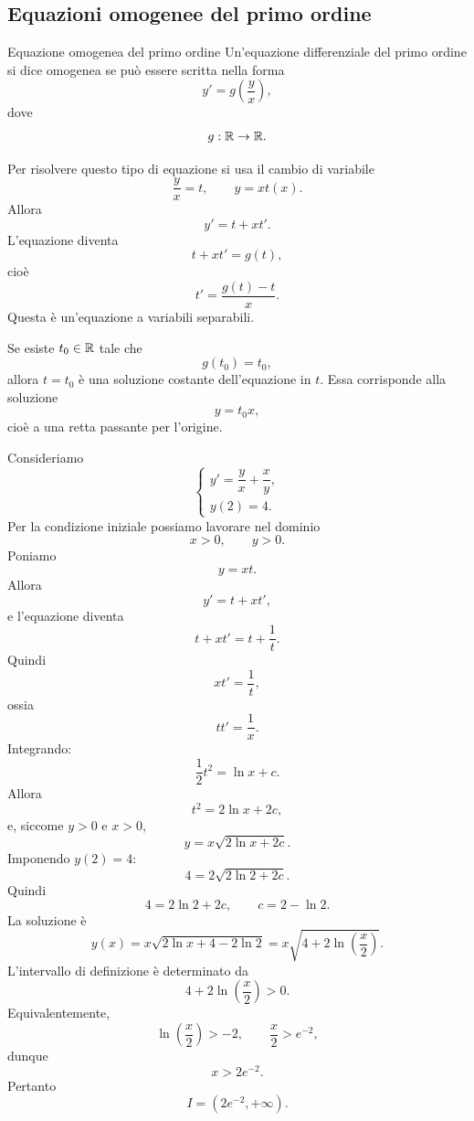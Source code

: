 \documentclass[a4paper]{article}
\begin{document}
\subsection{Equazioni omogenee del primo ordine}

\begin{radioactive}
\begin{snippetdefinition}{Equazione omogenea del primo ordine}
    Un'equazione differenziale del primo ordine si dice omogenea se può essere scritta nella forma
    \[
        y'=g\left(\frac{y}{x}\right),
    \]
    dove
    \[
        g:\mathbb{R}\to\mathbb{R}.
    \]
\end{snippetdefinition}
\end{radioactive}

\begin{radioactive}
Per risolvere questo tipo di equazione si usa il cambio di variabile
\[
    \frac{y}{x}=t,
    \qquad
    y=xt(x).
\]
Allora
\[
    y'=t+xt'.
\]
L'equazione diventa
\[
    t+xt'=g(t),
\]
cioè
\[
    t'=\frac{g(t)-t}{x}.
\]
Questa è un'equazione a variabili separabili.

Se esiste \(t_0\in\mathbb{R}\) tale che
\[
    g(t_0)=t_0,
\]
allora \(t=t_0\) è una soluzione costante dell'equazione in \(t\). Essa corrisponde alla soluzione
\[
    y=t_0x,
\]
cioè a una retta passante per l'origine.
\end{radioactive}

\begin{radioactive}
\begin{snippetexample}{}
    Consideriamo
    \[
        \begin{cases}
            y'=\dfrac{y}{x}+\dfrac{x}{y},\\
            y(2)=4.
        \end{cases}
    \]
    Per la condizione iniziale possiamo lavorare nel dominio
    \[
        x>0,
        \qquad
        y>0.
    \]
    Poniamo
    \[
        y=xt.
    \]
    Allora
    \[
        y'=t+xt',
    \]
    e l'equazione diventa
    \[
        t+xt'=t+\frac{1}{t}.
    \]
    Quindi
    \[
        xt'=\frac{1}{t},
    \]
    ossia
    \[
        tt'=\frac{1}{x}.
    \]
    Integrando:
    \[
        \frac{1}{2}t^2=\ln x+c.
    \]
    Allora
    \[
        t^2=2\ln x+2c,
    \]
    e, siccome \(y>0\) e \(x>0\),
    \[
        y=x\sqrt{2\ln x+2c}.
    \]
    Imponendo \(y(2)=4\):
    \[
        4=2\sqrt{2\ln 2+2c}.
    \]
    Quindi
    \[
        4=2\ln 2+2c,
        \qquad
        c=2-\ln 2.
    \]
    La soluzione è
    \[
        y(x)=x\sqrt{2\ln x+4-2\ln 2}
        =
        x\sqrt{4+2\ln\left(\frac{x}{2}\right)}.
    \]
    L'intervallo di definizione è determinato da
    \[
        4+2\ln\left(\frac{x}{2}\right)>0.
    \]
    Equivalentemente,
    \[
        \ln\left(\frac{x}{2}\right)>-2,
        \qquad
        \frac{x}{2}>e^{-2},
    \]
    dunque
    \[
        x>2e^{-2}.
    \]
    Pertanto
    \[
        I=(2e^{-2},+\infty).
    \]
\end{snippetexample}
\end{radioactive}
\end{document}
